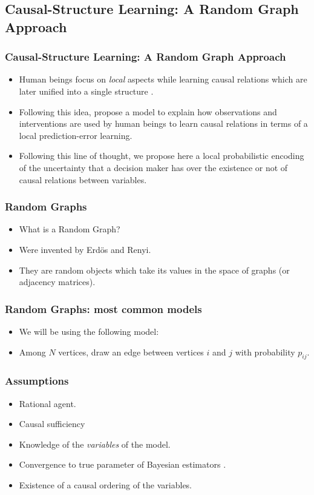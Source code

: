 \documentclass{beamer}
\theoremstyle{plain}
\begin{document}
\subsection{Causal-Structure Learning: A Random Graph Approach}{\label{random_graph}}
\begin{frame}
\frametitle{Causal-Structure Learning: A Random Graph Approach}
\begin{itemize}
\item Human beings focus on \textit{local} aspects while learning causal relations which are later unified into a single structure \citep{fernbach2009causal,waldmann2008causal, danks2014unifying}.
\item Following this idea, \cite{wellen2012learning} propose a model to explain how observations  and interventions are used by human beings to learn causal relations in terms of a local prediction-error learning.
\item Following this line of thought, we propose here a local probabilistic encoding of the uncertainty that a decision maker has over the existence or not of causal relations between variables.
\end{itemize}
\end{frame}

\begin{frame}
\frametitle{Random Graphs}
\begin{itemize}
\item What is a Random Graph? 
\item Were invented by Erdös and Renyi. 
\item They are random objects which take its values in the space of graphs (or adjacency matrices).
\end{itemize}
\end{frame}

\begin{frame}
\frametitle{Random Graphs: most common models}
\begin{itemize}
\item We will be using the following model:
\item Among $N$ vertices, draw an edge between vertices $i$ and $j$ with probability $p_{ij}$.
\end{itemize}
\end{frame}

\begin{frame}
\frametitle{Assumptions}
\begin{itemize}
\item Rational agent.
\item Causal sufficiency
\item Knowledge of the \textit{variables} of the model.
\item Convergence to true parameter of Bayesian estimators \cite{autzen2018bayesian}.
\item Existence of a causal ordering of the variables.
\end{itemize}
\end{frame}
\end{document}
